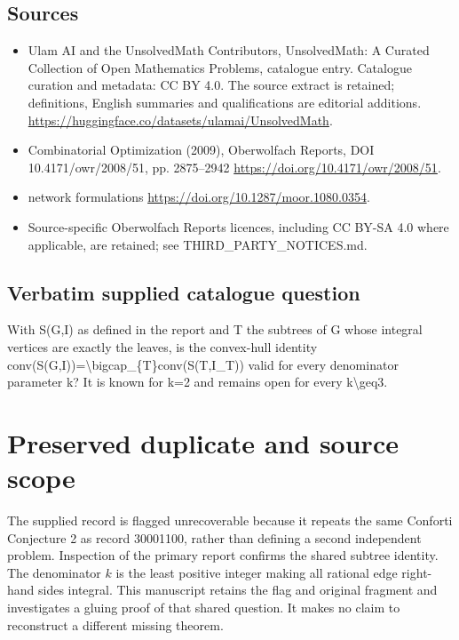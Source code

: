 \documentclass[11pt]{article}
\begin{document}
\subsection{Sources}
\begin{itemize}
\item[S1] Ulam AI and the UnsolvedMath Contributors, UnsolvedMath: A Curated Collection of Open Mathematics Problems, catalogue entry. Catalogue curation and metadata: CC BY 4.0. The source extract is retained; definitions, English summaries and qualifications are editorial additions.
\url{https://huggingface.co/datasets/ulamai/UnsolvedMath}.
\item[S2] Combinatorial Optimization (2009), Oberwolfach Reports, DOI 10.4171/owr/2008/51, pp. 2875--2942
\url{https://doi.org/10.4171/owr/2008/51}.
\item[S3] network formulations
\url{https://doi.org/10.1287/moor.1080.0354}.
\item Source-specific Oberwolfach Reports licences, including CC BY-SA 4.0 where applicable, are retained; see THIRD\_PARTY\_NOTICES.md.
\end{itemize}
\subsection{Verbatim supplied catalogue question}
With S(G,I) as defined in the report and T the subtrees of G whose integral vertices are exactly the leaves, is the convex-hull identity conv(S(G,I))=\textbackslash{}bigcap\_\{T\}conv(S(T,I\_T)) valid for every denominator parameter k? It is known for k=2 and remains open for every k\textbackslash{}geq3.

\section{Preserved duplicate and source scope}
The supplied record is flagged unrecoverable because it repeats the same
Conforti Conjecture 2 as record 30001100, rather than defining a second
independent problem. Inspection of the primary report confirms the shared
subtree identity. The denominator $k$ is the least positive integer making
all rational edge right-hand sides integral. This manuscript retains the
flag and original fragment and investigates a gluing proof of that shared
question. It makes no claim to reconstruct a different missing theorem.
\end{document}

